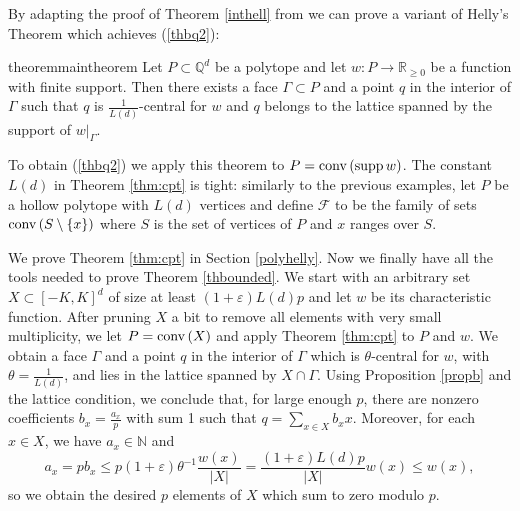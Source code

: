 \documentclass{daj}
\renewcommand{\le}{\leqslant}
\renewcommand{\ge}{\geqslant}
\newcommand{\R}{\mathbb R}
\newcommand{\Q}{\mathbb Q}
\newcommand{\N}{\mathbb N}
\newcommand{\conv}{{\rm conv}\,}
\newcommand{\F}{\mathcal F}
\newtheorem{theorem}{Theorem}[section]
\theoremstyle{definition}
\theoremstyle{remark}
\theoremstyle{definition}
\theoremstyle{definition}
\begin{document}
By adapting the proof of Theorem \ref{inthell} from \cite{D} we can prove a variant of Helly's Theorem which achieves (\ref{thbq2}):

\begin{restatable}{theorem}{maintheorem}\label{thm:cpt}
Let $P \subset \Q^d$ be a polytope and let $w: P \rightarrow \R_{\ge 0}$ be a function with finite support. Then there exists a face $\Gamma \subset P$ and a point $q$ in the interior of $\Gamma$ such that $q$ is $\frac{1}{L(d)}$-central for $w$ and $q$ belongs to the lattice spanned by the support of $w|_\Gamma$.
\end{restatable}


To obtain (\ref{thbq2}) we apply this theorem to $P = \conv(\operatorname{supp} w)$. The constant $L(d)$ in Theorem \ref{thm:cpt} is tight: similarly to the previous examples, let $P$ be a hollow polytope with $L(d)$ vertices and define $\F$ to be the family of sets $\conv(S \setminus \{x\})$ where $S$ is the set of vertices of $P$ and $x$ ranges over $S$.

We prove Theorem \ref{thm:cpt} in Section \ref{polyhelly}. Now we finally have all the tools needed to prove Theorem \ref{thbounded}. We start with an arbitrary set $X \subset [-K, K]^d$ of size at least $(1+\varepsilon) L(d) p$ and let $w$ be its characteristic function. After pruning $X$ a bit to remove all elements with very small multiplicity, we let $P = \conv(X)$ and apply Theorem \ref{thm:cpt} to $P$ and $w$. We obtain a face $\Gamma$ and a point $q$ in the interior of $\Gamma$ which is $\theta$-central for $w$, with $\theta = \frac{1}{L(d)}$, and lies in the lattice spanned by $X \cap \Gamma$.
Using Proposition \ref{propb} and the lattice condition, we conclude that, for large enough $p$, there are nonzero coefficients $b_x = \frac{a_x}{p}$ with sum 1 such that $q = \sum_{x \in X} b_x x$. Moreover, for each $x \in X$, we have $a_x\in \N$ and 
$$
a_x = p b_x \le p (1+\varepsilon) \theta^{-1} \frac{w(x)}{|X|} = \frac{(1+\varepsilon)L(d)p}{|X|} w(x) \le w(x),
$$
so we obtain the desired $p$ elements of $X$ which sum to zero modulo $p$.
\end{document}
